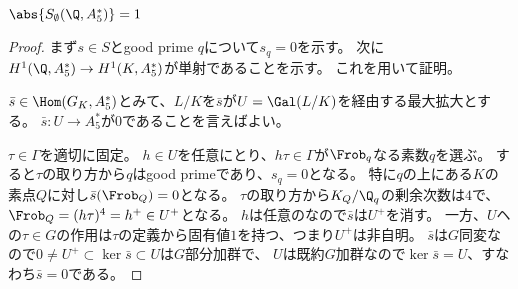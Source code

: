 \documentclass{jsarticle}
\begin{document}
\begin{prop}
$\abs{S_\emptyset(\Q,A_5^*)}=1$
\end{prop}
\begin{proof}
まず$s\in S$とgood prime $q$について$s_q=0$を示す。
次に$H^1(\Q,A_5^*)\to H^1(K,A_5^*)$が単射であることを示す。
これを用いて証明。

$\bar{s}\in\Hom(G_K,A_5^*)$とみて、$L/K$を$\bar{s}$が$U=\Gal(L/K)$を経由する最大拡大とする。
$\bar{s}\colon U\to  A_5^*$が$0$であることを言えばよい。

$\tau\in\Gamma$を適切に固定。
$h\in U$を任意にとり、$h\tau\in\Gamma$が$\Frob_q$なる素数$q$を選ぶ。
すると$\tau$の取り方から$q$はgood primeであり、$s_q=0$となる。
特に$q$の上にある$K$の素点$Q$に対し$\bar{s}(\Frob_Q)=0$となる。
$\tau$の取り方から$K_Q/\Q_q$の剰余次数は$4$で、$\Frob_Q=(h\tau)^4=h^+\in U^+$となる。
$h$は任意のなので$\bar{s}$は$U^+$を消す。
一方、$U$ヘの$\tau\in G$の作用は$\tau$の定義から固有値$1$を持つ、つまり$U^+$は非自明。
$\bar{s}$は$G$同変なので$0\neq U^+\subset\ker\bar{s}\subset U$は$G$部分加群で、
$U$は既約$G$加群なので$\ker\bar{s}=U$、すなわち$\bar{s}=0$である。
\end{proof}
\end{document}
